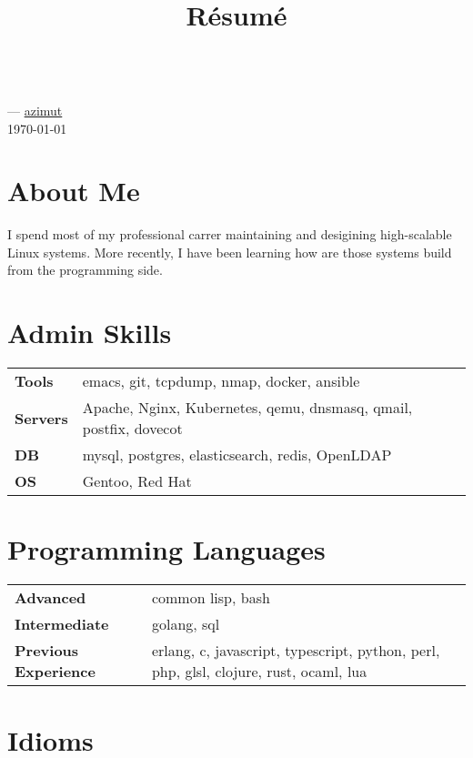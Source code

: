\documentclass[11pt]{article}
\renewcommand{\maketitle}{
  \begin{center}{\huge\bfseries\theauthor} \\
    \vspace{.25em}
    {\faEnvelope} \href {mailto:\MAILTO} {\expandafter\randomize\expandafter{\MAILTO}}
    ---
    {\faGithub} \href {https://github.com/azimut} {azimut} \\
    \vspace{.25em}
    \today
  \end{center}
}
\begin{document}
\title{R\'esum\'e}
\author{\FULLNAME}

\maketitle


\section{About Me}

I spend most of my professional carrer maintaining and desigining high-scalable Linux systems. More recently, I have been learning how are those systems build from the programming side.


\section{Admin Skills}


\begin{tabular}{@{}lll@{}}
  \hspace{.1em} \textbf{Tools}   & emacs, git, tcpdump, nmap, docker, ansible \\
  \hspace{.1em} \textbf{Servers} & Apache, Nginx, Kubernetes, qemu, dnsmasq, qmail, postfix, dovecot \\
  \hspace{.1em} \textbf{DB}      & mysql, postgres, elasticsearch, redis, OpenLDAP \\
  \hspace{.1em} \textbf{OS}      & Gentoo, Red Hat
\end{tabular}


\section{Programming Languages}


\begin{tabular}{@{}lll@{}}
  \hspace{.1em} \textbf{Advanced} & common lisp, bash \\
  \hspace{.1em} \textbf{Intermediate} & golang, sql \\
  \hspace{.1em} \textbf{Previous Experience} & erlang, c, javascript, typescript, python, perl, php, glsl, clojure, rust, ocaml, lua
\end{tabular}


\section{Idioms}
\end{document}
